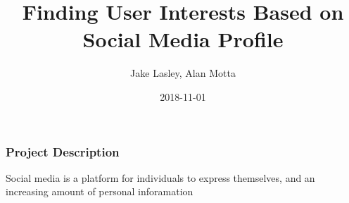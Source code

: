 \documentclass[pdf]{beamer}
\title{Finding User Interests Based on Social Media Profile}
\date{2018-11-01}
\author{Jake Lasley, Alan Motta}
\begin{document}
\frame{\titlepage}

\begin{frame}[]
  \frametitle{Project Description}
  Social media is a platform for individuals to express themselves,
  and an increasing amount of personal inforamation 
  
\end{frame}
\end{document}
